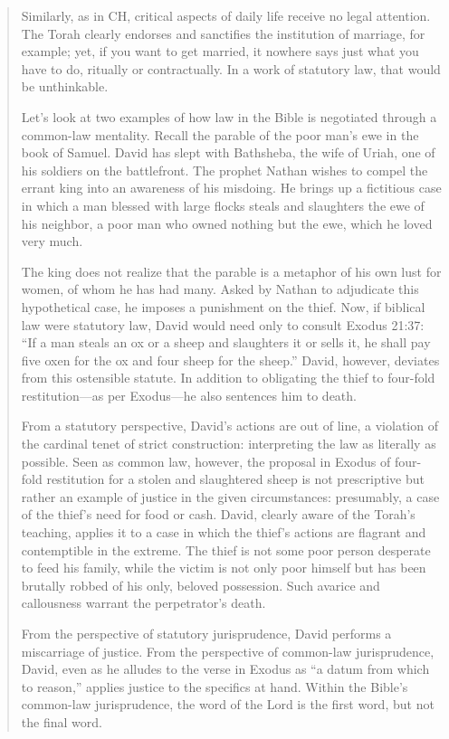 \documentclass[11pt]{article}
\begin{document}
\begin{quote}
Similarly, as in CH, critical aspects of daily life receive no legal attention. The Torah clearly endorses and sanctifies the institution of marriage, for example; yet, if you want to get married, it nowhere says just what you have to do, ritually or contractually. In a work of statutory law, that would be unthinkable.

Let’s look at two examples of how law in the Bible is negotiated through a common-law mentality. Recall the parable of the poor man’s ewe in the book of Samuel. David has slept with Bathsheba, the wife of Uriah, one of his soldiers on the battlefront. The prophet Nathan wishes to compel the errant king into an awareness of his misdoing. He brings up a fictitious case in which a man blessed with large flocks steals and slaughters the ewe of his neighbor, a poor man who owned nothing but the ewe, which he loved very much.

The king does not realize that the parable is a metaphor of his own lust for women, of whom he has had many. Asked by Nathan to adjudicate this hypothetical case, he imposes a punishment on the thief. Now, if biblical law were statutory law, David would need only to consult Exodus 21:37: “If a man steals an ox or a sheep and slaughters it or sells it, he shall pay five oxen for the ox and four sheep for the sheep.” David, however, deviates from this ostensible statute. In addition to obligating the thief to four-fold restitution—as per Exodus—he also sentences him to death.

From a statutory perspective, David’s actions are out of line, a violation of the cardinal tenet of strict construction: interpreting the law as literally as possible. Seen as common law, however, the proposal in Exodus of four-fold restitution for a stolen and slaughtered sheep is not prescriptive but rather an example of justice in the given circumstances: presumably, a case of the thief’s need for food or cash. David, clearly aware of the Torah’s teaching, applies it to a case in which the thief’s actions are flagrant and contemptible in the extreme. The thief is not some poor person desperate to feed his family, while the victim is not only poor himself but has been brutally robbed of his only, beloved possession. Such avarice and callousness warrant the perpetrator’s death. 

From the perspective of statutory jurisprudence, David performs a miscarriage of justice. From the perspective of common-law jurisprudence, David, even as he alludes to the verse in Exodus as “a datum from which to reason,” applies justice to the specifics at hand. Within the Bible’s common-law jurisprudence, the word of the Lord is the first word, but not the final word. 


\end{quote}
\end{document}
